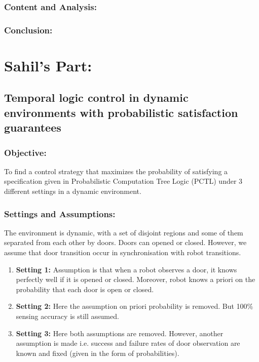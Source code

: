 \documentclass{article}
\theoremstyle{definition}
\begin{document}
\subsubsection{Content and Analysis:}

\subsubsection{Conclusion:}


\section{Sahil's Part:}
\subsection{Temporal logic control in dynamic environments with probabilistic satisfaction guarantees}
\subsubsection{Objective:}
To find a control strategy that maximizes the
probability of satisfying a specification given in Probabilistic
Computation Tree Logic (PCTL) under 3 different settings in a dynamic environment.
\subsubsection{Settings and Assumptions:}
The environment is dynamic, with a set of disjoint regions and some of them separated from each other by doors. Doors can opened or closed.
However, we assume that door transition occur in synchronisation with robot transitions.
\begin{enumerate}
    \item \textbf{Setting 1:}
        Assumption is that when a robot observes a door, it knows perfectly well if it is opened or closed. Moreover, robot knows a priori on the probability that each door is open or closed.
    \item \textbf{Setting 2:}
        Here the assumption on priori probability is removed. But 100\% sensing accuracy is still assumed.
    \item \textbf{Setting 3:}
        Here both assumptions are removed. However, another assumption is made i.e. success and failure rates of door observation are known and fixed (given in the form of probabilities).
\end{enumerate}
\end{document}
